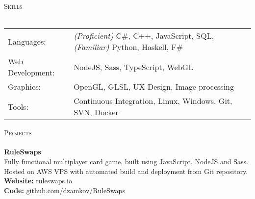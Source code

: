 \documentclass[a4paper]{article}
\newcommand{\lineunder} {
    \vspace*{-8pt} \\
    \hspace*{-18pt} \hrulefill \\
}
\newcommand{\header} [1] {
    {\hspace*{-18pt}\vspace*{6pt} \textsc{#1}}
    \vspace*{-6pt} \lineunder
}
\begin{document}
\header{Skills}
\begin{tabular}{ l l }
	Languages: & \textit{(Proficient)} C\#, C++, JavaScript, SQL, \textit{(Familiar)} Python, Haskell, F\# \\
	Web Development: & NodeJS, Sass, TypeScript, WebGL\\
	Graphics: & OpenGL, GLSL, UX Design, Image processing \\
	Tools: &  Continuous Integration, Linux, Windows, Git, SVN, Docker
	
\end{tabular}
\vspace{2mm}

\header{Projects}
{\textbf{RuleSwaps}} \\
Fully functional multiplayer card game, built using JavaScript, NodeJS and Sass. Hosted on AWS VPS with automated build and deployment from Git repository. \\
\textbf{Website:} ruleswaps.io \\
\textbf{Code:} github.com/dzamkov/RuleSwaps
\vspace*{2mm}



\ 
\end{document}
